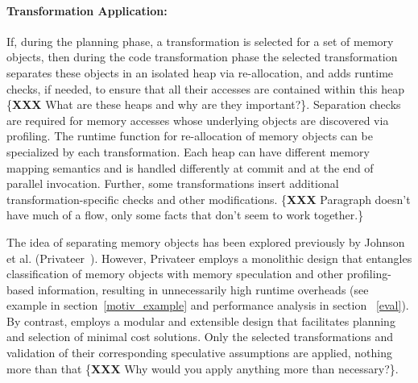 %
%
%
%
%

\paragraph{Transformation Application:} If, during the planning phase,
a transformation is selected for a set of memory objects, then during
the code transformation phase the selected transformation separates
these objects in an isolated heap via re-allocation, and adds runtime
checks, if needed, to ensure that all their accesses are contained
within this heap \{\textbf{XXX} What are these heaps and why are they
important?\}.
Separation checks are required for memory accesses whose underlying
objects are discovered via profiling.
The runtime function for re-allocation of memory objects can be
specialized by each transformation.
%
Each heap can have different memory mapping semantics and is handled
differently at commit and at the end of parallel invocation.
%
Further, some transformations insert additional
transformation-specific checks and other modifications.
\{\textbf{XXX} Paragraph doesn't have much of a flow, only some facts that
don't seem to work together.\}

The idea of separating memory objects has been explored previously by
Johnson et al. (Privateer~\cite{johnson:12:pldi}).  However, Privateer
employs a monolithic design that entangles classification of memory
objects with memory speculation and other
profiling-based information, resulting in unnecessarily high runtime
overheads (see example in section~\ref{motiv_example} and performance
analysis in section ~\ref{eval}).
%
By contrast, \name employs a modular and extensible design that
facilitates planning and selection of minimal cost solutions.
%
Only the selected transformations and validation of their
corresponding speculative assumptions are applied, nothing more than
that \{\textbf{XXX} Why would you apply anything more than necessary?\}.



